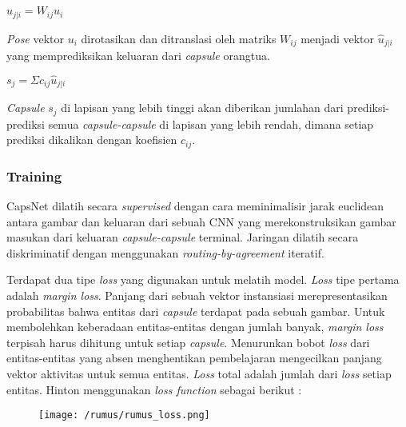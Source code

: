\documentclass{article}
\begin{document}
	   	\begin{center}
	   		\Large $\hat{u}_{j|i} = W_{ij}u_{i}$
	   	\end{center}
	   	
	   	\par
	   	\textit{Pose} vektor $u_{i}$ dirotasikan dan ditranslasi oleh matriks $W_{ij}$ menjadi vektor $\hat{u}_{j|i}$ yang memprediksikan keluaran dari \textit{capsule} orangtua.
	   	
	   	\begin{center}
	   		\Large $s_{j} = \Sigma c_{ij} \hat{u}_{j|i}$
	   	\end{center}
	   
	   \par
	   \textit{Capsule} $s_{j}$ di lapisan yang lebih tinggi akan diberikan jumlahan dari prediksi-prediksi semua \textit{capsule-capsule} di lapisan yang lebih rendah, dimana setiap prediksi dikalikan dengan koefisien $c_{ij}$.
	   	
	   	\subsubsection{Training}
	   	CapsNet dilatih secara \textit{supervised} dengan cara meminimalisir jarak euclidean antara gambar dan keluaran dari sebuah CNN yang merekonstruksikan gambar masukan dari keluaran \textit{capsule-capsule} terminal. Jaringan dilatih secara diskriminatif dengan menggunakan \textit{routing-by-agreement} iteratif. 
	   	\par
	   	Terdapat dua tipe \textit{loss} yang digunakan untuk melatih model. \textit{Loss} tipe pertama adalah \textit{margin loss}. Panjang dari sebuah vektor instansiasi merepresentasikan probabilitas bahwa entitas dari \textit{capsule} terdapat pada sebuah gambar. Untuk membolehkan keberadaan entitas-entitas dengan jumlah banyak, \textit{margin loss} terpisah harus dihitung untuk setiap \textit{capsule}. Menurunkan bobot \textit{loss} dari entitas-entitas yang absen menghentikan pembelajaran mengecilkan panjang vektor aktivitas untuk semua entitas. \textit{Loss} total adalah jumlah dari \textit{loss} setiap entitas. Hinton menggunakan \textit{loss function} sebagai berikut :
	   	
		\begin{figure}[H]
			\centering
			\texttt{[image: /rumus/rumus\_loss.png]}
		\end{figure}
		
\end{document}
